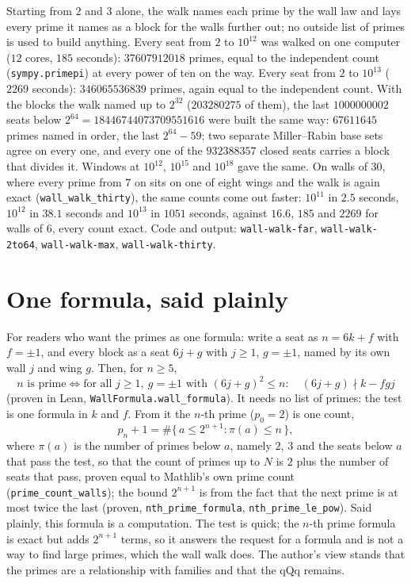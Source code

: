 \documentclass[11pt]{article}
\begin{document}
Starting from $2$ and $3$ alone, the walk names each prime by the wall law and lays every prime it names as a block for the walls further out; no outside list of primes is used to build anything. Every seat from $2$ to $10^{12}$ was walked on one computer ($12$ cores, $185$ seconds): $37607912018$ primes, equal to the independent count (\texttt{sympy.primepi}) at every power of ten on the way. Every seat from $2$ to $10^{13}$ ($2269$ seconds): $346065536839$ primes, again equal to the independent count. With the blocks the walk named up to $2^{32}$ ($203280275$ of them), the last $1000000002$ seats below $2^{64} = 18446744073709551616$ were built the same way: $67611645$ primes named in order, the last $2^{64}-59$; two separate Miller--Rabin base sets agree on every one, and every one of the $932388357$ closed seats carries a block that divides it. Windows at $10^{12}$, $10^{15}$ and $10^{18}$ gave the same. On walls of $30$, where every prime from $7$ on sits on one of eight wings and the walk is again exact (\texttt{wall\_walk\_thirty}), the same counts come out faster: $10^{11}$ in $2.5$ seconds, $10^{12}$ in $38.1$ seconds and $10^{13}$ in $1051$ seconds, against $16.6$, $185$ and $2269$ for walls of $6$, every count exact. Code and output: \texttt{wall-walk-far}, \texttt{wall-walk-2to64}, \texttt{wall-walk-max}, \texttt{wall-walk-thirty}.

\section{One formula, said plainly}
For readers who want the primes as one formula: write a seat as $n = 6k+f$ with $f=\pm1$, and every block as a seat $6j+g$ with $j\ge1$, $g=\pm1$, named by its own wall $j$ and wing $g$. Then, for $n\ge5$,
\[ n \text{ is prime} \iff \text{for all } j\ge1,\ g=\pm1 \text{ with } (6j+g)^2\le n:\quad (6j+g)\nmid k - f g j \]
(proven in Lean, \texttt{WallFormula.wall\_formula}). It needs no list of primes: the test is one formula in $k$ and $f$. From it the $n$-th prime ($p_0 = 2$) is one count,
\[ p_n + 1 = \#\{\, a \le 2^{n+1} : \pi(a) \le n \,\}, \]
where $\pi(a)$ is the number of primes below $a$, namely $2$, $3$ and the seats below $a$ that pass the test, so that the count of primes up to $N$ is $2$ plus the number of seats that pass, proven equal to Mathlib's own prime count (\texttt{prime\_count\_walls}); the bound $2^{n+1}$ is from the fact that the next prime is at most twice the last (proven, \texttt{nth\_prime\_formula}, \texttt{nth\_prime\_le\_pow}). Said plainly, this formula is a computation. The test is quick; the $n$-th prime formula is exact but adds $2^{n+1}$ terms, so it answers the request for a formula and is not a way to find large primes, which the wall walk does. The author's view stands that the primes are a relationship with families and that the qQq remains.
\end{document}

